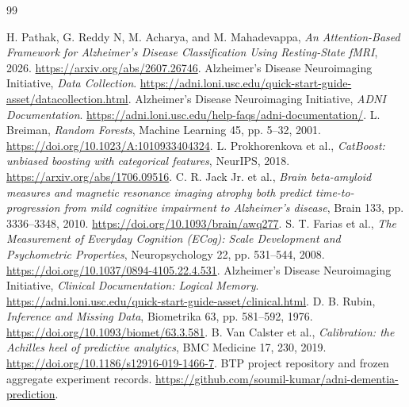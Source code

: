 \documentclass[11pt,a4paper]{article}
\begin{document}
\clearpage
\begin{thebibliography}{99}
 H. Pathak, G. Reddy N, M. Acharya, and M. Mahadevappa, \emph{An Attention-Based Framework for Alzheimer's Disease Classification Using Resting-State fMRI}, 2026. \url{https://arxiv.org/abs/2607.26746}.
 Alzheimer's Disease Neuroimaging Initiative, \emph{Data Collection}. \url{https://adni.loni.usc.edu/quick-start-guide-asset/datacollection.html}.
 Alzheimer's Disease Neuroimaging Initiative, \emph{ADNI Documentation}. \url{https://adni.loni.usc.edu/help-faqs/adni-documentation/}.
 L. Breiman, \emph{Random Forests}, Machine Learning 45, pp. 5--32, 2001. \url{https://doi.org/10.1023/A:1010933404324}.
 L. Prokhorenkova et al., \emph{CatBoost: unbiased boosting with categorical features}, NeurIPS, 2018. \url{https://arxiv.org/abs/1706.09516}.
 C. R. Jack Jr. et al., \emph{Brain beta-amyloid measures and magnetic resonance imaging atrophy both predict time-to-progression from mild cognitive impairment to Alzheimer's disease}, Brain 133, pp. 3336--3348, 2010. \url{https://doi.org/10.1093/brain/awq277}.
 S. T. Farias et al., \emph{The Measurement of Everyday Cognition (ECog): Scale Development and Psychometric Properties}, Neuropsychology 22, pp. 531--544, 2008. \url{https://doi.org/10.1037/0894-4105.22.4.531}.
 Alzheimer's Disease Neuroimaging Initiative, \emph{Clinical Documentation: Logical Memory}. \url{https://adni.loni.usc.edu/quick-start-guide-asset/clinical.html}.
 D. B. Rubin, \emph{Inference and Missing Data}, Biometrika 63, pp. 581--592, 1976. \url{https://doi.org/10.1093/biomet/63.3.581}.
 B. Van Calster et al., \emph{Calibration: the Achilles heel of predictive analytics}, BMC Medicine 17, 230, 2019. \url{https://doi.org/10.1186/s12916-019-1466-7}.
 BTP project repository and frozen aggregate experiment records. \url{https://github.com/soumil-kumar/adni-dementia-prediction}.
\end{thebibliography}
\end{document}
